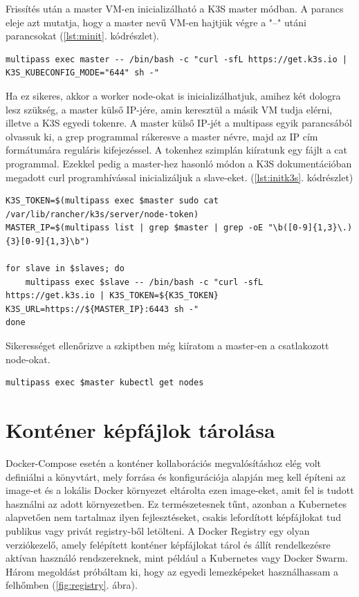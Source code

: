 \noindent
Frissítés után a master VM-en inicializálható a K3S master módban. A parancs eleje azt mutatja, hogy a master nevű VM-en hajtjük végre a "--" utáni parancsokat (\ref{lst:minit}. kódrészlet).
\begin{minipage}{\linewidth}
\begin{lstlisting}[caption={K3S Master inicializálása},label={lst:minit}]
multipass exec master -- /bin/bash -c "curl -sfL https://get.k3s.io | K3S_KUBECONFIG_MODE="644" sh -"
\end{lstlisting}
\end{minipage}
\noindent
Ha ez sikeres, akkor a worker node-okat is inicializálhatjuk, amihez két dologra lesz szükség, a master külső IP-jére, amin keresztül a másik VM tudja elérni, illetve a K3S egyedi tokenre. A master külső IP-jét a multipass egyik parancsából olvassuk ki, a grep programmal rákeresve a master névre, majd az IP cím formátumára reguláris kifejezéssel. A tokenhez szimplán kiíratunk egy fájlt a cat programmal. Ezekkel pedig a master-hez hasonló módon a K3S dokumentációban megadott curl programhívással inicializáljuk a slave-eket. (\ref{lst:initk3s}. kódrészlet)
\begin{minipage}{\linewidth}
\begin{lstlisting}[caption={K3S Slave-ek inicializálása},label={lst:initk3s}]
K3S_TOKEN=$(multipass exec $master sudo cat /var/lib/rancher/k3s/server/node-token)
MASTER_IP=$(multipass list | grep $master | grep -oE "\b([0-9]{1,3}\.){3}[0-9]{1,3}\b")

for slave in $slaves; do
	multipass exec $slave -- /bin/bash -c "curl -sfL https://get.k3s.io | K3S_TOKEN=${K3S_TOKEN} K3S_URL=https://${MASTER_IP}:6443 sh -"
done
\end{lstlisting}
\end{minipage}

\noindent
Sikerességet ellenőrizve a szkiptben még kiíratom a master-en a csatlakozott node-okat.
\begin{lstlisting}[caption={Node-ok lekérdezése}]
multipass exec $master kubectl get nodes
\end{lstlisting}

\section{Konténer képfájlok tárolása}
Docker-Compose esetén a konténer kollaborációs megvalósításhoz elég volt definiálni a könyvtárt, mely forrása és konfigurációja alapján meg kell építeni az image-et és a lokális Docker környezet eltárolta ezen image-eket, amit fel is tudott használni az adott környezetben. Ez természetesnek tűnt, azonban a Kubernetes alapvetően nem tartalmaz ilyen fejlesztéseket, csakis lefordított képfájlokat tud publikus vagy privát registry-ből letölteni. A Docker Registry egy olyan verziókezelő, amely felépített konténer képfájlokat tárol és állít rendelkezésre aktívan használó rendszereknek, mint például a Kubernetes vagy Docker Swarm. Három megoldást próbáltam ki, hogy az egyedi lemezképeket használhassam a felhőmben (\ref{fig:registry}. ábra).\\


